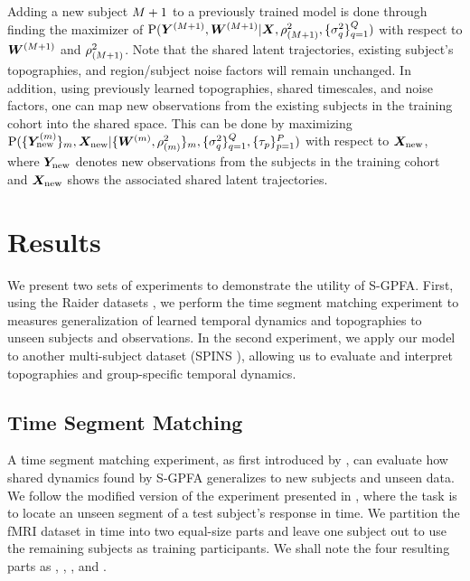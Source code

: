 \sloppy Adding a new subject $M+1$ to a previously trained model is done through finding the maximizer of $\text{P}(\bm{Y}^{(M+1)}, \bm{W}^{(M+1)} | \bm{X}, \rho_{(M+1)}^2,  \{\sigma_{q}^2\}_{q=1}^Q)$ with respect to $\bm{W}^{(M+1)}$ and $\rho_{(M+1)}^2$. Note that the shared latent trajectories, existing subject's topographies, and region/subject noise factors will remain unchanged.
In addition, using previously learned topographies, shared timescales, and noise factors, one can map new observations from the existing subjects in the training cohort into the shared space. This can be done by maximizing 
$\text{P}(\{\bm{Y}_{\text{new}}^{(m)}\}_{m}, \bm{X}_{\text{new}} | \{\bm{W}^{(m)}, \rho_{(m)}^2\}_{m}, \{\sigma_{q}^2\}_{q=1}^Q, \{\tau_p\}_{p=1}^P)$
with respect to $\bm{X}_{\text{new}}$, where $\bm{Y}_{\text{new}}$ denotes new observations from the subjects in the training cohort and $\bm{X}_{\text{new}}$ shows the associated shared latent trajectories. 


\section{Results}
\label{sec:experiments}

We present two sets of experiments to demonstrate the utility of S-GPFA. First, using the Raider datasets \cite{ha}, we perform the time segment matching experiment to measures generalization of learned temporal dynamics and topographies to unseen subjects and observations. In the second experiment, we apply our model to another multi-subject dataset (SPINS \cite{spins}), allowing us to evaluate and interpret topographies and group-specific temporal dynamics. 

\subsection{Time Segment Matching}
A time segment matching experiment, as first introduced by \cite{ha}, can evaluate how shared dynamics found by S-GPFA generalizes to new subjects and unseen data. We follow the modified version of the experiment presented in \cite{srm}, where the task is to locate an unseen segment of a test subject's response in time. We partition the fMRI dataset in time into two equal-size parts and leave one subject out to use the remaining subjects as training participants. We shall note the four resulting parts as , , , and .

